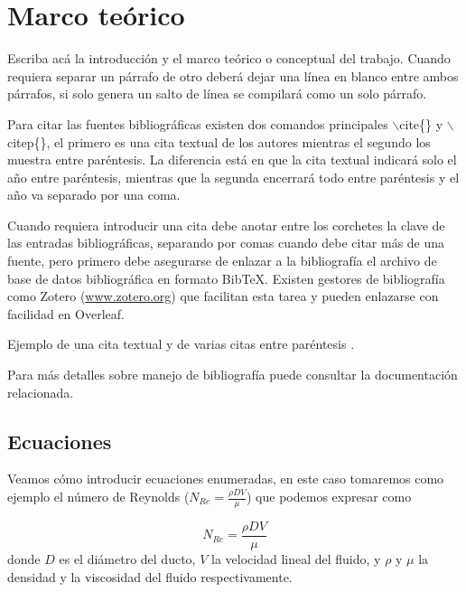 \section{Marco teórico}
\label{sec:Marco}

	Escriba acá la introducción y el marco teórico o conceptual del trabajo. Cuando requiera separar un párrafo de otro deberá dejar una línea en blanco entre ambos párrafos, si solo genera un salto de línea se compilará como un solo párrafo.
  
	Para citar las fuentes bibliográficas existen dos comandos principales $\backslash$cite\{\} y $\backslash$citep\{\}, el primero es una cita textual de los autores mientras el segundo los muestra entre paréntesis. La diferencia está en que la cita textual indicará solo el año entre paréntesis, mientras que la segunda encerrará todo entre paréntesis y el año va separado por una coma.

Cuando requiera introducir una cita debe anotar entre los corchetes la clave de las entradas bibliográficas, separando por comas cuando debe citar más de una fuente, pero primero debe asegurarse de enlazar a la bibliografía el archivo de base de datos bibliográfica en formato BibTeX. Existen gestores de bibliografía como Zotero (\url{www.zotero.org}) que facilitan esta tarea y pueden enlazarse con facilidad en Overleaf.

Ejemplo de una cita textual \cite{buckley1985design} y de varias citas entre paréntesis \citep{buckley1985design}.

Para más detalles sobre manejo de bibliografía puede consultar la documentación relacionada.

\subsection{Ecuaciones}

Veamos cómo introducir ecuaciones enumeradas, en este caso tomaremos como ejemplo el número de Reynolds ($N_{Re} = \frac{\rho D V}{\mu}$) que podemos expresar como

\begin{equation}
	\label{ec:Reynolds}
	N_{Re} = \frac{\rho D V}{\mu}
\end{equation}
donde $D$ es el diámetro del ducto, $V$ la velocidad lineal del fluido, y $\rho$ y $\mu$ la densidad y la viscosidad del fluido respectivamente.


